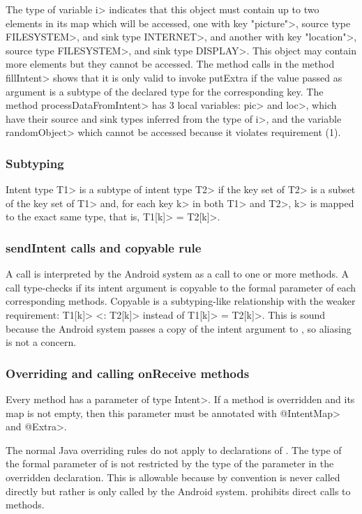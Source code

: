 \noindent
The type of variable \<i> indicates that this object must contain up to two
elements in its map which
will be accessed, one with key \<"picture">, source type \<FILESYSTEM>, and sink type
\<INTERNET>, and another with key \<"location">, source type \<FILESYSTEM>, and sink
type \<DISPLAY>. This object may contain more elements but they cannot be
accessed. The method calls in the method \<fillIntent> shows that it is only
valid to invoke putExtra if the value passed as argument is a subtype of the
declared type for the corresponding key. The method \<processDataFromIntent> has 3
local variables: \<pic> and \<loc>, which have their source and sink types
inferred from the type of \<i>, and the variable \<randomObject> which cannot be
accessed because it violates requirement (1).


\subsubsection{Subtyping}
Intent type \<T1> is a subtype of intent type \<T2> if the key set of 
\<T2> is a subset of the key set of \<T1> and, for each key \<k> in both 
\<T1> and \<T2>, \<k> is mapped to the exact same type, that is, 
\<T1[k]> = \<T2[k]>.

\subsubsection{sendIntent calls and copyable rule}
A \sendIntent{} call is interpreted by the Android system as a call to one
or more \onReceive{} methods.
A \sendIntent{} call type-checks if its intent argument is
copyable to the formal parameter of each corresponding \onReceive{} methods.
Copyable is a subtyping-like relationship with the weaker requirement: 
\<T1[k]> <: \<T2[k]> instead of \<T1[k]> = \<T2[k]>.
This is sound because the Android system passes a copy of the intent argument to
\onReceive{}, so aliasing is not a concern.

\subsubsection{Overriding and calling onReceive methods}
Every \onReceive{} method has a parameter of type \<Intent>. If a \onReceive{}
method is overridden and its map is not empty, then this parameter must be
annotated with \<@IntentMap> and \<@Extra>.

The normal Java overriding rules do not apply to declarations of \onReceive{}. The
type of the formal parameter of \onReceive{} is not restricted by the type of the
parameter in the overridden declaration. This is allowable because by convention
\onReceive{} is never called directly but rather is only called by the Android
system. \TheIntentChecker{} prohibits direct calls to \onReceive{} methods.


